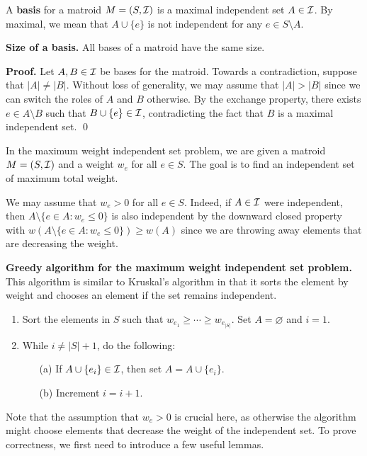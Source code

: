 \documentclass{article}
\begin{document}
A {\bf basis} for a matroid $M = (S, {\cal I})$ is a maximal independent set
$A \in {\cal I}$. By maximal, we mean that $A \cup \{e\}$ is not independent for any 
$e \in S \setminus A$. 

{\color{violet} 
{\bf Size of a basis.} All bases of a matroid have the same size. 
}

{\color{blue}
{\bf Proof.} Let $A, B \in {\cal I}$ be bases for the matroid. 
Towards a contradiction, suppose that $|A| \neq |B|$. Without loss 
of generality, we may assume that $|A| > |B|$ since we can switch the 
roles of $A$ and $B$ otherwise. By the exchange property, there 
exists $e \in A \setminus B$ such that $B \cup \{e\} \in {\cal I}$, 
contradicting the fact that $B$ is a maximal independent set. \qed 
}

In the maximum weight independent set problem, we are given a 
matroid $M = (S, {\cal I})$ and a weight $w_e$ for all $e \in S$. The 
goal is to find an independent set of maximum total weight. 

We may assume that $w_e > 0$ for all $e \in S$. Indeed, if 
$A \in {\cal I}$ were independent, then $A \setminus \{e \in A : 
w_e \leq 0\}$ is also independent by the downward closed property with 
$w(A \setminus \{e \in A : w_e \leq 0\}) \geq w(A)$ since we 
are throwing away elements that are decreasing the weight. 

{\color{violet}
{\bf Greedy algorithm for the maximum weight independent set problem.}
This algorithm is similar to Kruskal's algorithm in that it sorts 
the element by weight and chooses an element if the set remains independent.
\begin{enumerate}
    \item Sort the elements in $S$ such that $w_{e_1} \geq \cdots 
    \geq w_{e_{|S|}}$. Set $A = \varnothing$ and $i = 1$. 
    \item While $i \neq |S| + 1$, do the following: 
    \begin{enumerate}
        \item [(a)] If $A \cup \{e_i\} \in {\cal I}$, then set $A = A \cup \{e_i\}$. 
        \item [(b)] Increment $i = i+1$. 
    \end{enumerate}
\end{enumerate}
}

Note that the assumption that $w_e > 0$ is crucial here, as otherwise the 
algorithm might choose elements that decrease the weight of the 
independent set. To prove correctness, we first need to introduce a 
few useful lemmas.
\end{document}
